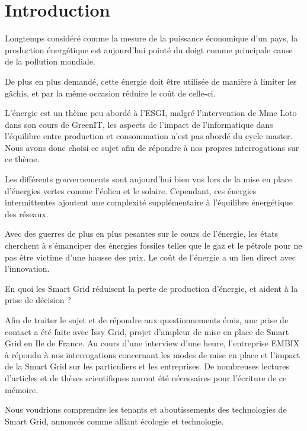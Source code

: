 \chapter*{Introduction}

Longtemps considéré comme la mesure de la puissance économique d'un pays,
la production énergétique est aujourd'hui pointé du doigt comme principale
cause de la pollution mondiale.

De plus en plus demandé, cette énergie doit être utilisée de manière à limiter les gâchis,
et par la même occasion réduire le coût de celle-ci.


L'énergie est un thème peu abordé à l'ESGI, malgré l'intervention de Mme Loto dans son cours de GreenIT, les
aspects de l'impact de l'informatique dans l'équilibre entre production et consommation n'est pas abordé
du cycle master. Nous avons donc choisi ce sujet afin de répondre à nos propres interrogations sur ce thème.

Les différents gouvernements sont aujourd'hui bien vus lors de la mise en place
d'énergies vertes comme l'éolien et le solaire. Cependant, ces énergies intermittentes ajoutent
une complexité supplémentaire à l'équilibre énergétique des réseaux.

Avec des guerres de plus en plus pesantes sur le cours de l'énergie, les états cherchent à s'émanciper
des énergies fossiles telles que le gaz et le pétrole pour ne pas être victime d'une hausse des prix.
Le coût de l'énergie a un lien direct avec l'innovation.


En quoi les Smart Grid réduisent la perte de production d'énergie, et aident à la
prise de décision ?

Afin de traiter le sujet et de répondre aux questionnements émis, une prise de contact a été faite
avec Issy Grid, projet d'ampleur de mise en place de Smart Grid en Ile de France.
Au cours d'une interview d'une heure, l'entreprise EMBIX à répondu à nos interrogations concernant les modes
de mise en place et l'impact de la Smart Grid sur les particuliers et les entreprises.
De nombreuses lectures d'articles et de thèses scientifiques auront été nécessaires
pour l'écriture de ce mémoire.

Nous voudrions comprendre les tenants et aboutissements des technologies de Smart Grid, annoncés comme
alliant écologie et technologie.

